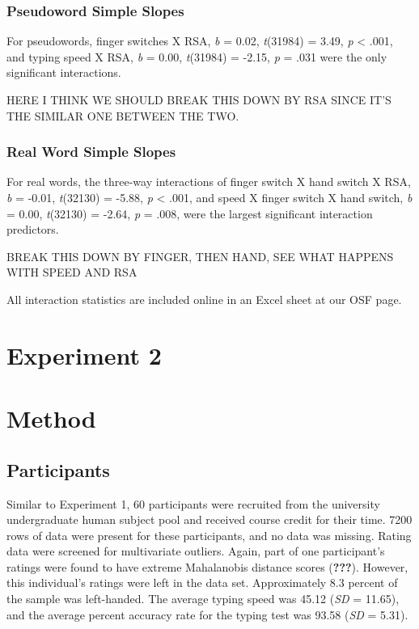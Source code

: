 \documentclass[english,man]{apa6}
\theoremstyle{definition}
\theoremstyle{definition}
\theoremstyle{definition}
\theoremstyle{remark}
\begin{document}
\subsubsection{Pseudoword Simple Slopes}\label{pseudoword-simple-slopes}

For pseudowords, finger switches X RSA, \emph{b} = 0.02, \emph{t}(31984)
= 3.49, \emph{p} \textless{} .001, and typing speed X RSA, \emph{b} =
0.00, \emph{t}(31984) = -2.15, \emph{p} = .031 were the only significant
interactions.

HERE I THINK WE SHOULD BREAK THIS DOWN BY RSA SINCE IT'S THE SIMILAR ONE
BETWEEN THE TWO.

\subsubsection{Real Word Simple Slopes}\label{real-word-simple-slopes}

For real words, the three-way interactions of finger switch X hand
switch X RSA, \emph{b} = -0.01, \emph{t}(32130) = -5.88, \emph{p}
\textless{} .001, and speed X finger switch X hand switch, \emph{b} =
0.00, \emph{t}(32130) = -2.64, \emph{p} = .008, were the largest
significant interaction predictors.

BREAK THIS DOWN BY FINGER, THEN HAND, SEE WHAT HAPPENS WITH SPEED AND
RSA

All interaction statistics are included online in an Excel sheet at our
OSF page.

\section{Experiment 2}\label{experiment-2}

\section{Method}\label{method-1}

\subsection{Participants}\label{participants-1}

Similar to Experiment 1, 60 participants were recruited from the
university undergraduate human subject pool and received course credit
for their time. 7200 rows of data were present for these participants,
and no data was missing. Rating data were screened for multivariate
outliers. Again, part of one participant's ratings were found to have
extreme Mahalanobis distance scores ({\textbf{???}}). However, this
individual's ratings were left in the data set. Approximately 8.3
percent of the sample was left-handed. The average typing speed was
45.12 (\emph{SD} = 11.65), and the average percent accuracy rate for the
typing test was 93.58 (\emph{SD} = 5.31).
\end{document}
